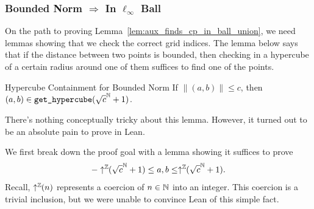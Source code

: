 \documentclass{article}
\begin{document}




\subsubsection{Bounded Norm $\Rightarrow$ In $\ell_\infty$ Ball}
On the path to proving Lemma~\ref{lem:aux_finds_cp_in_ball_union}, we need lemmas showing that we check the correct grid indices.
The lemma below says that if the distance between two points is bounded, then checking in a hypercube of a certain radius around one of them suffices to find one of the points.
\begin{tcblemma}{Hypercube Containment for Bounded Norm}{}
  If $\|(a, b)\| \leq c$, then $(a, b) \in \texttt{get\_hypercube}(\sqrt{c}^{\mathbb{N}} + 1)$.
\end{tcblemma}
There's nothing conceptually tricky about this lemma.
However, it turned out to be an absolute pain to prove in Lean.

We first break down the proof goal with a lemma showing it suffices to prove
\[ -\uparrow^{\mathbb{Z}}\!\!(\sqrt{c}^{\mathbb{N}} + 1) \leq a, b \leq \uparrow^{\mathbb{Z}}\!\!(\sqrt{c}^{\mathbb{N}} + 1). \]
Recall, $\uparrow^{\mathbb{Z}}\!\!(n)$ represents a coercion of $n \in \mathbb{N}$ into an integer.
This coercion is a trivial inclusion, but we were unable to convince Lean of this simple fact.
\end{document}
